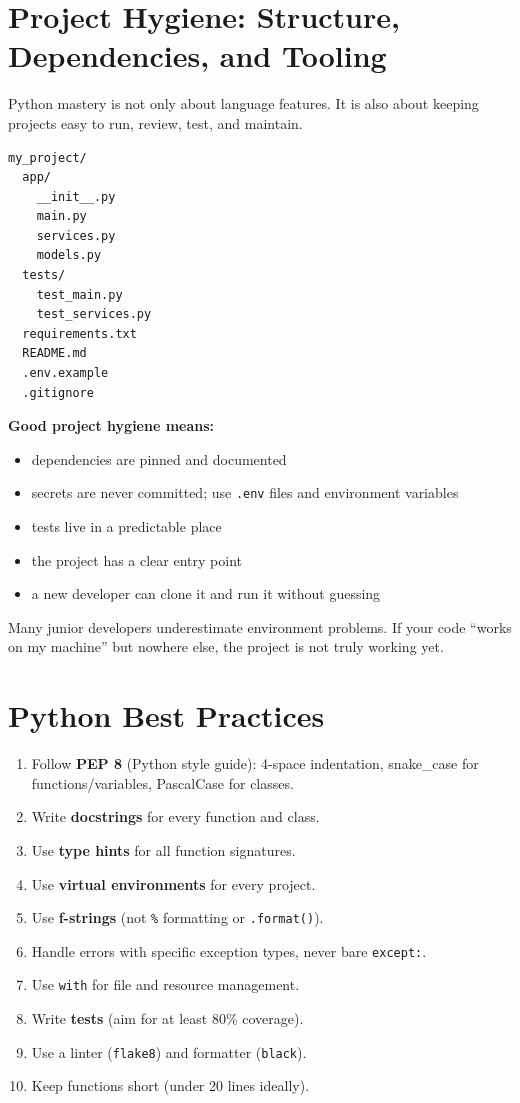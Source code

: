 \documentclass[12pt, a4paper, oneside]{book}
\begin{document}
\section{Project Hygiene: Structure, Dependencies, and Tooling}

Python mastery is not only about language features. It is also about keeping projects easy to run, review, test, and maintain.

\begin{lstlisting}[language=bash, caption={A clean Python project layout}]
my_project/
  app/
    __init__.py
    main.py
    services.py
    models.py
  tests/
    test_main.py
    test_services.py
  requirements.txt
  README.md
  .env.example
  .gitignore
\end{lstlisting}

\textbf{Good project hygiene means:}
\begin{itemize}[leftmargin=2em]
    \item dependencies are pinned and documented
    \item secrets are never committed; use \texttt{.env} files and environment variables
    \item tests live in a predictable place
    \item the project has a clear entry point
    \item a new developer can clone it and run it without guessing
\end{itemize}

\begin{warningbox}
Many junior developers underestimate environment problems. If your code ``works on my machine'' but nowhere else, the project is not truly working yet.
\end{warningbox}

\section{Python Best Practices}

\begin{enumerate}[leftmargin=2em]
    \item Follow \textbf{PEP 8} (Python style guide): 4-space indentation, snake\_case for functions/variables, PascalCase for classes.
    \item Write \textbf{docstrings} for every function and class.
    \item Use \textbf{type hints} for all function signatures.
    \item Use \textbf{virtual environments} for every project.
    \item Use \textbf{f-strings} (not \texttt{\%} formatting or \texttt{.format()}).
    \item Handle errors with specific exception types, never bare \texttt{except:}.
    \item Use \texttt{with} for file and resource management.
    \item Write \textbf{tests} (aim for at least 80\% coverage).
    \item Use a linter (\texttt{flake8}) and formatter (\texttt{black}).
    \item Keep functions short (under 20 lines ideally).
\end{enumerate}
\end{document}
